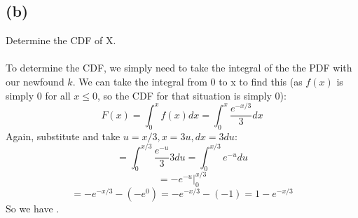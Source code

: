 \documentclass{article}
\begin{document}
{\subsection*{(b)} 
Determine the CDF of X.
\\
\\
To determine the CDF, we simply need to take the integral of the the PDF with our newfound \(k\). We can take the integral from 0 to x to find this (as \(f(x)\) is simply 0 for all \(x \leq 0\), so the CDF for that situation is simply 0):
\[
F(x) = \int_{0}^{x} f(x) dx = \int_{0}^{x} \frac{e^{-x/3}}{3} dx
\]
Again, substitute and take \(u = x/3, x = 3u, dx = 3du\):
\[
= \int_{0}^{x/3} \frac{e^{-u}}{3} 3du = \int_{0}^{x/3} e^{-u}du
\]
\[
= -e^{-u} \Big|_{0}^{x/3}
\]
\[
= -e^{-x/3} - (-e^0) = -e^{-x/3} - (-1) = 1 - e^{-x/3}
\]
So we have .

}
\end{document}
